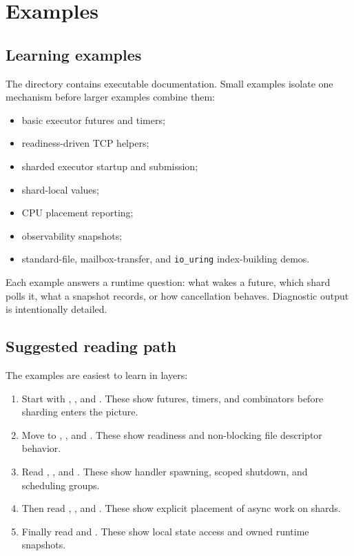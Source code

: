 \chapter{Examples}
\label{chap:examples}

\section{Learning examples}

The  directory contains executable
documentation. Small examples isolate one mechanism before larger examples
combine them:

\begin{itemize}
    \item basic executor futures and timers;
    \item readiness-driven TCP helpers;
    \item sharded executor startup and submission;
    \item shard-local values;
    \item CPU placement reporting;
    \item observability snapshots;
    \item standard-file, mailbox-transfer, and \texttt{io\_uring}
          index-building demos.
\end{itemize}

Each example answers a runtime question: what wakes a future, which shard polls
it, what a snapshot records, or how cancellation behaves. Diagnostic output is
intentionally detailed.

\section{Suggested reading path}

The examples are easiest to learn in layers:

\begin{enumerate}
    \item Start with ,
          , and .
          These show futures, timers, and combinators before sharding enters
          the picture.
    \item Move to , , and
          . These show readiness and non-blocking
          file descriptor behavior.
    \item Read ,
          , and
          . These show handler
          spawning, scoped shutdown, and scheduling groups.
    \item Then read ,
          , and .
          These show explicit placement of async work on shards.
    \item Finally read  and
          . These show local
          state access and owned runtime snapshots.
\end{enumerate}

